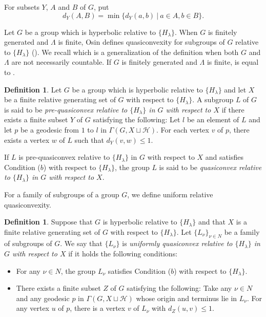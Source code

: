 \documentclass{amsart}
\theoremstyle{definition}
\newtheorem{Def}[Thm]{Definition}
\begin{document}
For subsets $Y$, $A$ and $B$ of $G$, put
$$
d_Y(A,B)=\min\{d_Y(a,b)\ | \ a\in A, b\in B\}.
$$

Let $G$ be a group which is hyperbolic relative to $\{H_\lambda\}$. 
When $G$ is finitely generated and $\Lambda$ is finite, Osin defines quasiconvexity for subgroups of $G$ relative to $\{H_\lambda\}$ (\cite[Definition 4.9]{Osi06}). 
We recall \cite[Definition 1.2]{M-O-Y1} which is a generalization of the definition when both $G$ and $\Lambda$ are not necessarily countable. 
If $G$ is finitely generated and $\Lambda$ is finite, \cite[Definition 1.2]{M-O-Y1} is equal to \cite[Definition 4.9]{Osi06}. 

\begin{Def}
\label{def-qc}
Let $G$ be a group which is hyperbolic relative to $\{H_\lambda\}$ and let $X$ be a finite relative generating set of $G$ with respect to $\{H_\lambda\}$. 
A subgroup $L$ of $G$ is said to be {\it pre-quasiconvex relative to $\{H_\lambda\}$ in $G$ with respect to $X$} if there exists a finite subset $Y$ of $G$ satisfying the following:
Let $l$ be an element of $L$ and let $p$ be a geodesic from $1$ to $l$ in $\Gamma(G, X\sqcup {\mathcal H})$. 
For each vertex $v$ of $p$, there exists a vertex $w$ of $L$ such that $d_Y(v,w)\le 1$.

If $L$ is pre-quasiconvex relative to $\{H_\lambda\}$ in $G$ with respect to $X$ and satisfies Condition ($b$) with respect to $\{H_\lambda\}$, the group $L$ is said to be {\it quasiconvex relative to $\{H_\lambda\}$ in $G$ with respect to $X$}. 
\end{Def}

For a family of subgroups of a group $G$, we define uniform relative quasiconvexity. 

\begin{Def}\label{urqc}
Suppose that $G$ is hyperbolic relative to $\{H_\lambda\}$ and that $X$ is a finite relative generating set of $G$ with respect to $\{H_\lambda\}$. 
Let $\{L_\nu\}_{\nu\in N}$ be a family of subgroups of $G$. 
We say that $\{L_\nu\}$ is {\it uniformly quasiconvex relative to $\{H_\lambda\}$ in $G$ with respect to $X$} if it holds the following conditions:
\begin{itemize}
\item For any $\nu \in N$, the group $L_\nu$ satisfies Condition ($b$) with respect to $\{H_\lambda\}$. 
\item There exists a finite subset $Z$ of $G$ satisfying the following:
Take any $\nu\in N$ and any geodesic $p$ in $\Gamma(G,X\sqcup{\mathcal H})$ whose origin and terminus lie in $L_\nu$. 
For any vertex $u$ of $p$, there is a vertex $v$ of $L_\nu$ with $d_Z(u,v)\leq 1$.  
\end{itemize}
 \end{Def}
\end{document}
